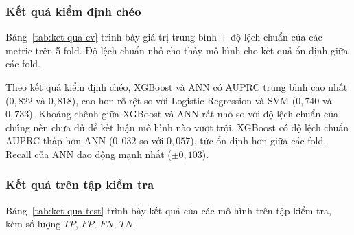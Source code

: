 \subsubsection{Kết quả kiểm định chéo}
Bảng~\ref{tab:ket-qua-cv} trình bày giá trị trung bình $\pm$ độ lệch chuẩn của các metric trên 5 fold. Độ lệch chuẩn nhỏ cho thấy mô hình cho kết quả ổn định giữa các fold.

\begin{table}[H]
\centering
{}
\caption{Kết quả kiểm định chéo 5-fold (trung bình $\pm$ độ lệch chuẩn). Giá trị in đậm là tốt nhất theo từng cột.}
\label{tab:ket-qua-cv}
\end{table}

Theo kết quả kiểm định chéo, XGBoost và ANN có AUPRC trung bình cao nhất ($0{,}822$ và $0{,}818$), cao hơn rõ rệt so với Logistic Regression và SVM ($0{,}740$ và $0{,}733$). Khoảng chênh giữa XGBoost và ANN rất nhỏ so với độ lệch chuẩn của chúng nên chưa đủ để kết luận mô hình nào vượt trội. XGBoost có độ lệch chuẩn AUPRC thấp hơn ANN ($0{,}032$ so với $0{,}057$), tức ổn định hơn giữa các fold. Recall của ANN dao động mạnh nhất ($\pm 0{,}103$).

\subsubsection{Kết quả trên tập kiểm tra}
Bảng~\ref{tab:ket-qua-test} trình bày kết quả của các mô hình trên tập kiểm tra, kèm số lượng $TP$, $FP$, $FN$, $TN$.

